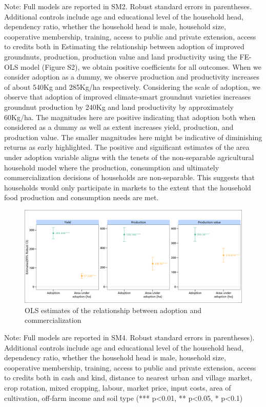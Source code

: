 \documentclass[
]{article}
\begin{document}
Note: Full models are reported in SM2. Robust standard errors in parentheses. Additional controls include age and educational level of the household head, dependency ratio, whether the household head is male, household size, cooperative membership, training, access to public and private extension, access to credits both in
\newpage
Estimating the relationship between adoption of improved groundnuts, production, production value and land productivity using the FE-OLS model (Figure S2), we obtain positive coefficients for all outcomes. When we consider adoption as a dummy, we observe production and productivity increases of about 540Kg and 285Kg/ha respectively. Considering the scale of adoption, we observe that adoption of improved climate-smart groundnut varieties increases groundnut production by 240Kg and land productivity by approximately 60Kg/ha. The magnitudes here are positive indicating that adoption both when considered as a dummy as well as extent increases yield, production, and production value. The smaller magnitudes here might be indicative of diminishing returns as early highlighted. The positive and significant estimates of the area under adoption variable aligns with the tenets of the non-separable agricultural household model where the production, consumption and ultimately commercialization decisions of households are non-separable. This suggests that households would only participate in markets to the extent that the household food production and consumption needs are met.

\begin{figure}[htbp]
\centering
\includegraphics[width=\textwidth]{figures/fig_SM2.png}
\caption{OLS estimates of the relationship between adoption and commercialization}
\end{figure}

Note: Full models are reported in SM4. Robust standard errors in parentheses). Additional controls include age and educational level of the household head, dependency ratio, whether the household head is male, household size, cooperative membership, training, access to public and private extension, access to credits both in cash and kind, distance to nearest urban and village market, crop rotation, mixed cropping, labour, market price, input costs, area of cultivation, off-farm income and soil type (*** p\textless0.01, ** p\textless0.05, * p\textless0.1)
\end{document}
